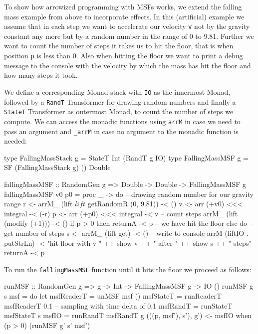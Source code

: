 To show how arrowized programming with MSFs works, we extend the falling mass example from above to incorporate effects. In this (artificial) example we assume that in each step we want to accelerate our velocity \texttt{v} not by the gravity constant any more but by a random number in the range of 0 to 9.81. Further we want to count the number of steps it takes us to hit the floor, that is when position \texttt{p} is less than 0. Also when hitting the floor we want to print a debug message to the console with the velocity by which the mass has hit the floor and how many steps it took.

We define a corresponding Monad stack with \texttt{IO} as the innermost Monad, followed by a \texttt{RandT} Transformer for drawing random numbers and finally a \texttt{StateT} Transformer as outermost Monad, to count the number of steps we compute. We can access the monadic functions using \texttt{arrM} in case we need to pass an argument and \texttt{\_arrM} in case no argument to the monadic function is needed:

\begin{HaskellCode}
type FallingMassStack g = StateT Int (RandT g IO)
type FallingMassMSF g   = SF (FallingMassStack g) () Double

fallingMassMSF :: RandomGen g => Double -> Double -> FallingMassMSF g
fallingMassMSF v0 p0 = proc _ -> do
  -- drawing random number for our gravity range
  r <- arrM_ (lift $ lift $ getRandomR (0, 9.81)) -< ()
  v <- arr (+v0) <<< integral -< (-r)
  p <- arr (+p0) <<< integral -< v
  -- count steps
  arrM_ (lift (modify (+1))) -< ()
  if p > 0
    then returnA -< p
    -- we have hit the floor
    else do
      -- get number of steps
      s <- arrM_ (lift get) -< ()
      -- write to console
      arrM (liftIO . putStrLn) -< "hit floor with v " ++ show v ++ 
                                  " after " ++ show s ++ " steps"
      returnA -< p
\end{HaskellCode}

To run the \texttt{fallingMassMSF} function until it hits the floor we proceed as follows:

\begin{HaskellCode}
runMSF :: RandomGen g => g -> Int -> FallingMassMSF g -> IO ()
runMSF g s msf = do
  let msfReaderT = unMSF msf ()
      msfStateT  = runReaderT msfReaderT 0.1 -- sampling with time delta of 0.1
      msfRandT   = runStateT msfStateT s
      msfIO      = runRandT msfRandT g
  (((p, msf'), s'), g') <- msfIO
  when (p > 0) (runMSF g' s' msf')
\end{HaskellCode}

